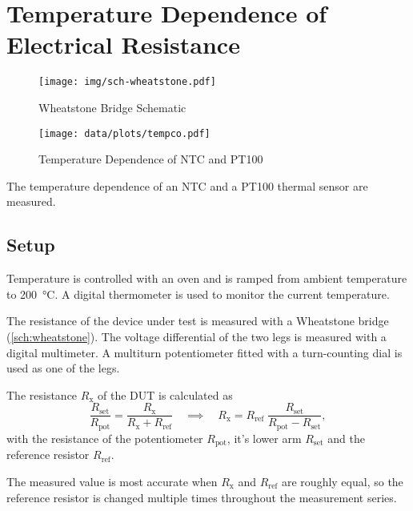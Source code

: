 \chapter{Temperature Dependence of Electrical Resistance}

\begin{figure}[tbp]
	\centering
	\texttt{[image: img/sch-wheatstone.pdf]}
	\caption{Wheatstone Bridge Schematic}
	\label{sch:wheatstone}
\end{figure}

\begin{figure}[tbp]
	\centering
	\texttt{[image: data/plots/tempco.pdf]}
	\caption{Temperature Dependence of NTC and PT100}
	\label{plot:tempco}
\end{figure}

The temperature dependence of an NTC and a PT100 thermal sensor are measured.

\section{Setup}

Temperature is controlled with an oven and is ramped from ambient temperature to \SI{200}{\celsius}.
A digital thermometer is used to monitor the current temperature.

The resistance of the device under test is measured with a Wheatstone bridge (\autoref{sch:wheatstone}).
The voltage differential of the two legs is measured with a digital multimeter.
A multiturn potentiometer fitted with a turn-counting dial is used as one of the legs.

The resistance $R_\text{x}$ of the DUT is calculated as
\begin{equation}
	\frac{R_\text{set}}{R_\text{pot}} = \frac{R_\text{x}}{R_\text{x} + R_\text{ref}}
	\quad \implies \quad R_\text{x} = R_\text{ref} \; \frac{R_\text{set}}{R_\text{pot} - R_\text{set}},
\end{equation}
with the resistance of the potentiometer $R_\text{pot}$, it's lower arm $R_\text{set}$ and the reference resistor $R_\text{ref}$.

The measured value is most accurate when $R_\text{x}$ and $R_\text{ref}$ are roughly equal, so the reference resistor is changed multiple times throughout the measurement series.

